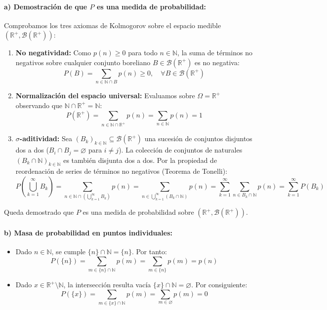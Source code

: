 \begin{problema}
\paragraph{a) Demostración de que $P$ es una medida de probabilidad:}
Comprobamos los tres axiomas de Kolmogorov sobre el espacio medible $(\mathbb{R}^+, \mathcal{B}(\mathbb{R}^+))$:
\begin{enumerate}[label=\arabic*.]
    \item \textbf{No negatividad:} Como $p(n) \ge 0$ para todo $n \in \mathbb{N}$, la suma de términos no negativos sobre cualquier conjunto boreliano $B \in \mathcal{B}(\mathbb{R}^+)$ es no negativa:
    \[
        P(B) = \sum_{n \in \mathbb{N} \cap B} p(n) \ge 0, \quad \forall B \in \mathcal{B}(\mathbb{R}^+)
    \]
    \item \textbf{Normalización del espacio universal:} Evaluamos sobre $\Omega = \mathbb{R}^+$ observando que $\mathbb{N} \cap \mathbb{R}^+ = \mathbb{N}$:
    \[
        P(\mathbb{R}^+) = \sum_{n \in \mathbb{N} \cap \mathbb{R}^+} p(n) = \sum_{n \in \mathbb{N}} p(n) = 1
    \]
    \item \textbf{$\sigma$-aditividad:} Sea $(B_k)_{k \in \mathbb{N}} \subseteq \mathcal{B}(\mathbb{R}^+)$ una sucesión de conjuntos disjuntos dos a dos ($B_i \cap B_j = \varnothing$ para $i \neq j$). La colección de conjuntos de naturales $(B_k \cap \mathbb{N})_{k \in \mathbb{N}}$ es también disjunta dos a dos. Por la propiedad de reordenación de series de términos no negativos (Teorema de Tonelli):
    \[
        P\left( \bigcup_{k=1}^\infty B_k \right) = \sum_{n \in \mathbb{N} \cap \left(\bigcup_{k=1}^\infty B_k\right)} p(n) = \sum_{n \in \bigcup_{k=1}^\infty (B_k \cap \mathbb{N})} p(n) = \sum_{k=1}^\infty \sum_{n \in B_k \cap \mathbb{N}} p(n) = \sum_{k=1}^\infty P(B_k)
    \]
\end{enumerate}
Queda demostrado que $P$ es una medida de probabilidad sobre $(\mathbb{R}^+, \mathcal{B}(\mathbb{R}^+))$.

\paragraph{b) Masa de probabilidad en puntos individuales:}
\begin{itemize}
    \item Dado $n \in \mathbb{N}$, se cumple $\{n\} \cap \mathbb{N} = \{n\}$. Por tanto:
    \[
        P(\{n\}) = \sum_{m \in \{n\} \cap \mathbb{N}} p(m) = \sum_{m \in \{n\}} p(m) = p(n)
    \]
    \item Dado $x \in \mathbb{R}^+ \setminus \mathbb{N}$, la intersección resulta vacía $\{x\} \cap \mathbb{N} = \varnothing$. Por consiguiente:
    \[
        P(\{x\}) = \sum_{m \in \{x\} \cap \mathbb{N}} p(m) = \sum_{m \in \varnothing} p(m) = 0
    \]
\end{itemize}


\end{problema}
